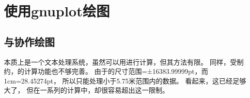 \documentclass[../main.tex]{subfiles}
\begin{document}
\section{使用gnuplot绘图}
\subsection{\TIKZ{}与协作绘图}

\TEX{}本质上是一个文本处理系统，虽然可以用\TEX{}进行计算，但其方法有限。
同样，受\TEX{}制约，\TIKZ{}的计算功能也不够完善。
由于\TEX{}的尺寸范围=±16383.99999pt，而1cm=28.45274pt，
所以\TEX{}只能处理小于5.75米范围内的数据。
看起来，这已经足够大了，
但在一系列的计算中，却很容易超出这一限制。
\end{document}
